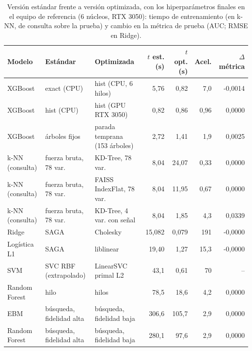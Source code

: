 \begin{table}[htbp]
\caption{Versión estándar frente a versión optimizada, con los hiperparámetros finales en el equipo de referencia (6 núcleos, RTX 3050): tiempo de entrenamiento (en k-NN, de consulta sobre la prueba) y cambio en la métrica de prueba (AUC; RMSE en Ridge).}\label{tab:computo}
\scriptsize\setlength{\tabcolsep}{2pt}
\begin{tabular}{l>{\raggedright\arraybackslash}p{2.0cm}>{\raggedright\arraybackslash}p{2.2cm}rrrr}
\toprule
\textbf{Modelo} & \textbf{Estándar} & \textbf{Optimizada} & \textbf{$t$ est. (s)} & \textbf{$t$ opt. (s)} & \textbf{Acel.} & \textbf{$\Delta$ métrica} \\
\midrule
XGBoost & exact (CPU) & hist (CPU, 6 hilos) & 5,76 & 0,82 & 7,0 & -0,0014 \\
XGBoost & hist (CPU) & hist (GPU RTX 3050) & 0,82 & 0,86 & 0,96 & 0,0000 \\
XGBoost & 500 árboles fijos & parada temprana (153 árboles) & 2,72 & 1,41 & 1,9 & 0,0025 \\
k-NN (consulta) & fuerza bruta, 78 var. & KD-Tree, 78 var. & 8,04 & 24,07 & 0,33 & 0,0000 \\
k-NN (consulta) & fuerza bruta, 78 var. & FAISS IndexFlat, 78 var. & 8,04 & 11,95 & 0,67 & 0,0000 \\
k-NN (consulta) & fuerza bruta, 78 var. & KD-Tree, 4 var. con señal & 8,04 & 1,85 & 4,3 & 0,0339 \\
Ridge & SAGA & Cholesky & 15,082 & 0,079 & 191 & -0,0000 \\
Logística L1 & SAGA & liblinear & 19,40 & 1,27 & 15,3 & -0,0000 \\
SVM & SVC RBF (extrapolado) & LinearSVC primal L2 & 43,1 & 0,61 & 70 & -- \\
Random Forest & 1 hilo & 6 hilos & 78,5 & 18,6 & 4,2 & 0,0000 \\
EBM & búsqueda, fidelidad alta & búsqueda, fidelidad baja & 306,6 & 105,7 & 2,9 & 0,0000 \\
Random Forest & búsqueda, fidelidad alta & búsqueda, fidelidad baja & 280,1 & 97,6 & 2,9 & 0,0000 \\
\bottomrule
\end{tabular}
\end{table}
